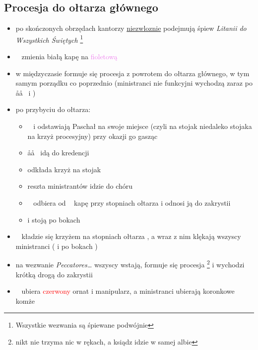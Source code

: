 \subsection{Procesja do ołtarza głównego}
\begin{itemize}
	\item po skończonych obrzędach kantorzy \underline{niezwloznie} podejmują
	      śpiew \textit{Litanii do Wszystkich Świętych} \footnote{Wszystkie
		      wezwania są śpiewane podwójnie}
	\item \ii~ zmienia białą kapę na \textcolor{violet}{fioletową}
	\item w międzyczasie formuje się procesja z powrotem do ołtarza głównego, w
	      tym samym porządku co poprzednio (ministranci nie funkcyjni wychodzą
	      zaraz po \aa\aa~ i )
	\item po przybyciu do ołtarza:
	      \begin{itemize}
		      \item \paschal~ i  odstawiają Paschał na swoje miejsce (czyli
		            na stojak niedaleko stojaka na krzyż procesyjny) przy okazji
		            go gasząc
		      \item \aa\aa~ idą do kredencji
		      \item {} odkłada krzyż na stojak
		      \item reszta ministrantów idzie do chóru
		      \item \zz~ odbiera od \ii~ kapę przy stopniach ołtarza i odnosi
		            ją do zakrystii
		      \item {} i  stoją po bokach \ii
	      \end{itemize}
	\item \ii~ kładzie się krzyżem na stopniach ołtarza , a wraz z nim klękają wszyscy
	      ministranci ( i  po bokach \ii)
	\item na wezwanie \textit{Peccatores\dots} wszyscy wstają, formuje się
	      procesja \footnote{nikt nie trzyma nic w rękach, a ksiądz idzie w
		      samej albie} i wychodzi krótką drogą do zakrystii
	\item \ii~ ubiera \textcolor{red}{czerwony} ornat i manipularz, a
	      ministranci ubierają koronkowe komże
\end{itemize}

